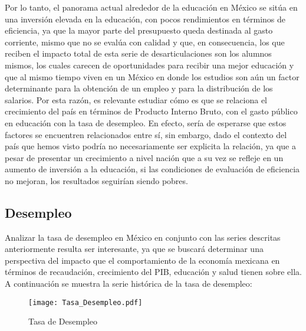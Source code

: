 Por lo tanto, el panorama actual alrededor de la educación en México se sitúa en una inversión elevada en la educación, con pocos rendimientos en términos de eficiencia, ya que la mayor parte del presupuesto queda destinada al gasto corriente, mismo que no se evalúa con calidad y que, en consecuencia,  los que reciben el impacto total de esta serie de desarticulaciones son los alumnos mismos, los cuales carecen de oportunidades para recibir una mejor educación y que al mismo tiempo viven en un México en donde los estudios son aún un factor determinante para la obtención de un empleo y para la distribución de los salarios. Por esta razón, es relevante estudiar cómo es que se relaciona el crecimiento del país en términos de Producto Interno Bruto, con el gasto público en educación con la tasa de desempleo. En efecto, sería de esperarse que estos factores se encuentren relacionados entre sí, sin embargo, dado el contexto del país que hemos visto podría no necesariamente ser explicita la relación, ya que a pesar de presentar un crecimiento a nivel nación que a su vez se refleje en un aumento de inversión a la educación, si las condiciones de evaluación de eficiencia no mejoran, los resultados seguirían siendo pobres. \bigskip



\newpage
\subsection{Desempleo}

Analizar la tasa de desempleo en México en conjunto con las series descritas anteriormente resulta ser interesante, ya que se buscará determinar una perspectiva del impacto que el comportamiento de la economía mexicana en términos de recaudación, crecimiento del PIB, educación y salud tienen sobre ella. A continuación se muestra la serie histórica de la tasa de desempleo:


\begin{figure}[H]
\centering
\texttt{[image: Tasa\_Desempleo.pdf]}
\caption{Tasa de Desempleo}
\label{Desempleo}
\end{figure}

